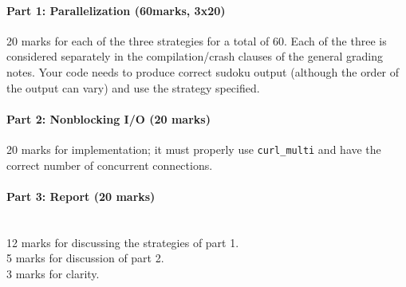 \documentclass[letterpaper,10pt]{article}
\begin{document}
\paragraph{Part 1: Parallelization (60marks, 3x20)}
20 marks for each of the three strategies for a total of 60.
Each of the three is considered separately in the compilation/crash 
clauses of the general grading notes.
Your code needs to produce correct sudoku output (although the order of the
output can vary) and use the strategy specified.

\paragraph{Part 2: Nonblocking I/O (20 marks)}
20 marks for implementation; it must properly use \texttt{curl\_multi} and 
have the correct number of concurrent connections.

\paragraph{Part 3: Report (20 marks)}~\\
12 marks for discussing the strategies of part 1.\\
5 marks for discussion of part 2.\\
3 marks for clarity.
\end{document}
